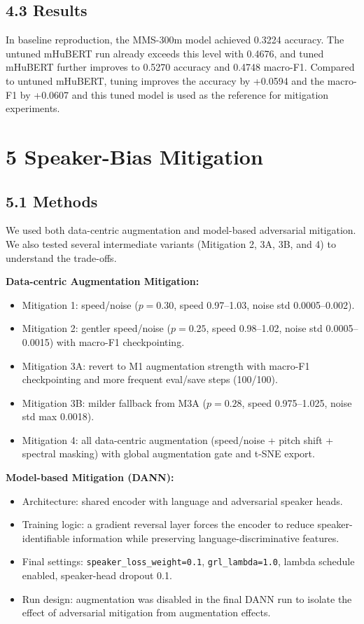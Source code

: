 \documentclass[11pt]{article}
\begin{document}
\subsection*{4.3 Results}
In baseline reproduction, the MMS-300m model achieved 0.3224 accuracy. The untuned mHuBERT run already exceeds this level with 0.4676, and tuned mHuBERT further improves to 0.5270 accuracy and 0.4748 macro-F1. 
Compared to untuned mHuBERT, tuning improves the accuracy by +0.0594 and the macro-F1 by +0.0607 and this tuned model is used as the reference for mitigation experiments.
\section*{5 Speaker-Bias Mitigation}
\subsection*{5.1 Methods}
We used both data-centric augmentation and model-based adversarial mitigation. We also tested several intermediate variants (Mitigation 2, 3A, 3B, and 4) to understand the trade-offs.

\textbf{Data-centric Augmentation Mitigation:}
\begin{itemize}
    \item Mitigation 1: speed/noise ($p=0.30$, speed 0.97--1.03, noise std 0.0005--0.002).
    \item Mitigation 2: gentler speed/noise ($p=0.25$, speed 0.98--1.02, noise std 0.0005--0.0015) with macro-F1 checkpointing.
    \item Mitigation 3A: revert to M1 augmentation strength with macro-F1 checkpointing and more frequent eval/save steps (100/100).
    \item Mitigation 3B: milder fallback from M3A ($p=0.28$, speed 0.975--1.025, noise std max 0.0018). 
    \item Mitigation 4: all data-centric augmentation (speed/noise + pitch shift + spectral masking) with global augmentation gate and t-SNE export.
\end{itemize}

\textbf{Model-based Mitigation (DANN):}
\begin{itemize}
    \item Architecture: shared encoder with language and adversarial speaker heads.
    \item Training logic: a gradient reversal layer forces the encoder to reduce speaker-identifiable information while preserving language-discriminative features.
    \item Final settings: \texttt{speaker\_loss\_weight=0.1}, \texttt{grl\_lambda=1.0}, lambda schedule enabled, speaker-head dropout 0.1.
    \item Run design: augmentation was disabled in the final DANN run to isolate the effect of adversarial mitigation from augmentation effects.
\end{itemize}
\end{document}
